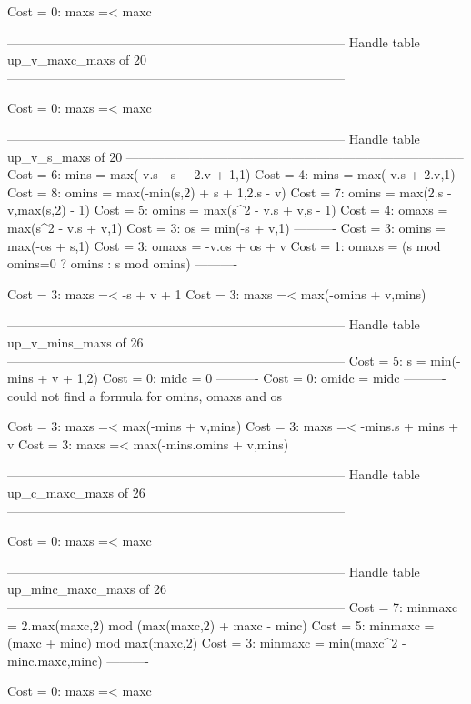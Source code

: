 Cost =  0:  maxs =< maxc

--------------------------------------------------------------------------------
Handle table up_v_maxc_maxs of 20
--------------------------------------------------------------------------------

Cost =  0:  maxs =< maxc

--------------------------------------------------------------------------------
Handle table up_v_s_maxs of 20
--------------------------------------------------------------------------------
Cost =  6:  mins  = max(-v.s - s + 2.v + 1,1)
Cost =  4:  mins  = max(-v.s + 2.v,1)
Cost =  8:  omins = max(-min(s,2) + s + 1,2.s - v)
Cost =  7:  omins = max(2.s - v,max(s,2) - 1)
Cost =  5:  omins = max(s^2 - v.s + v,s - 1)
Cost =  4:  omaxs = max(s^2 - v.s + v,1)
Cost =  3:  os    = min(-s + v,1)
----------
Cost =  3:  omins = max(-os + s,1)
Cost =  3:  omaxs = -v.os + os + v
Cost =  1:  omaxs = (s mod omins=0 ? omins : s mod omins)
----------

Cost =  3:  maxs =< -s + v + 1
Cost =  3:  maxs =< max(-omins + v,mins)

--------------------------------------------------------------------------------
Handle table up_v_mins_maxs of 26
--------------------------------------------------------------------------------
Cost =  5:  s     = min(-mins + v + 1,2)
Cost =  0:  midc  = 0
----------
Cost =  0:  omidc = midc
----------
could not find a formula for omins, omaxs and os

Cost =  3:  maxs =< max(-mins + v,mins)
Cost =  3:  maxs =< -mins.s + mins + v
Cost =  3:  maxs =< max(-mins.omins + v,mins)

--------------------------------------------------------------------------------
Handle table up_c_maxc_maxs of 26
--------------------------------------------------------------------------------

Cost =  0:  maxs =< maxc

--------------------------------------------------------------------------------
Handle table up_minc_maxc_maxs of 26
--------------------------------------------------------------------------------
Cost =  7:  minmaxc = 2.max(maxc,2) mod (max(maxc,2) + maxc - minc)
Cost =  5:  minmaxc = (maxc + minc) mod max(maxc,2)
Cost =  3:  minmaxc = min(maxc^2 - minc.maxc,minc)
----------

Cost =  0:  maxs =< maxc

